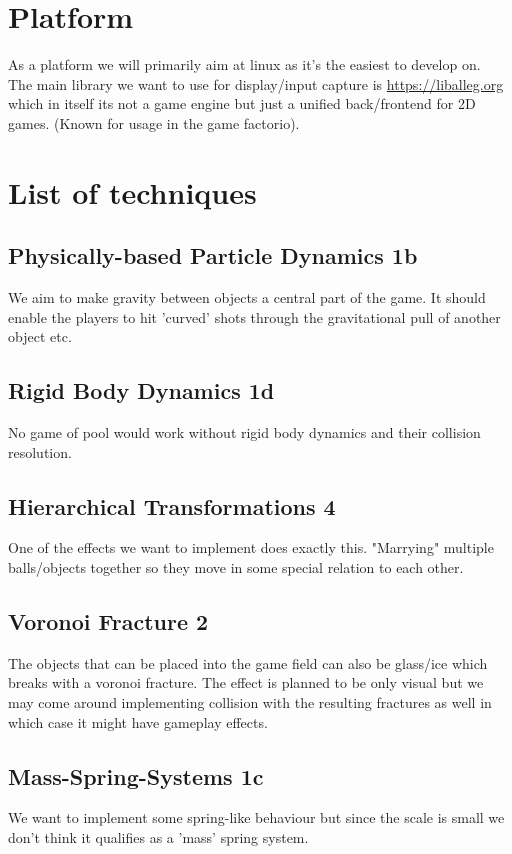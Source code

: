 \documentclass{article}
\begin{document}
 \FloatBarrier


\section{Platform}

As a platform we will primarily aim at linux as it's the easiest to develop on.\\
The main library we want to use for display/input capture is \url{https://liballeg.org} which in itself its not a game engine but just a unified back/frontend for 2D games. (Known for usage in the game factorio).



\section{List of techniques}


\subsection{Physically-based Particle Dynamics 1b}
We aim to make gravity between objects a central part of the game. It should enable the players to hit 'curved' shots through the gravitational pull of another object etc. 

\subsection{Rigid Body Dynamics 1d}
 
No game of pool would work without rigid body dynamics and their collision resolution.

\subsection{Hierarchical Transformations 4}

One of the effects we want to implement does exactly this. "Marrying" multiple balls/objects together so they move in some special relation to each other.


\subsection{Voronoi Fracture 2}

The objects that can be placed into the game field can also be glass/ice which breaks with a voronoi fracture. The effect is planned to be only visual but we may come around implementing collision with the resulting fractures as well in which case it might have gameplay effects.

\subsection{ Mass-Spring-Systems 1c}

We want to implement some spring-like behaviour but since the scale is small we don't think it qualifies as a 'mass' spring system. 




\end{document}
